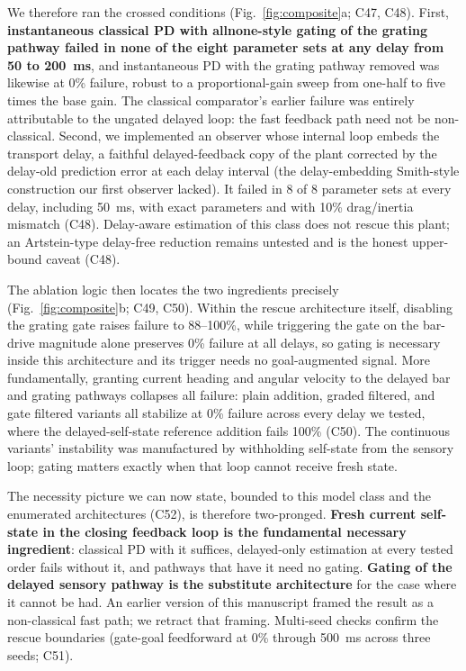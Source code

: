 \documentclass[pdflatex,sn-nature]{sn-jnl}
\begin{document}
We therefore ran the crossed conditions (Fig.~\ref{fig:composite}a; C47, C48). First, \textbf{instantaneous classical PD with allnone-style gating of the grating pathway failed in none of the eight parameter sets at any delay from 50 to 200~ms}, and instantaneous PD with the grating pathway removed was likewise at 0\% failure, robust to a proportional-gain sweep from one-half to five times the base gain. The classical comparator's earlier failure was entirely attributable to the ungated delayed loop: the fast feedback path need not be non-classical. Second, we implemented an observer whose internal loop embeds the transport delay, a faithful delayed-feedback copy of the plant corrected by the delay-old prediction error at each delay interval (the delay-embedding Smith-style construction our first observer lacked). It failed in 8 of 8 parameter sets at every delay, including 50~ms, with exact parameters and with 10\% drag/inertia mismatch (C48). Delay-aware estimation of this class does not rescue this plant; an Artstein-type delay-free reduction remains untested and is the honest upper-bound caveat (C48).

The ablation logic then locates the two ingredients precisely (Fig.~\ref{fig:composite}b; C49, C50). Within the rescue architecture itself, disabling the grating gate raises failure to 88--100\%, while triggering the gate on the bar-drive magnitude alone preserves 0\% failure at all delays, so gating is necessary inside this architecture and its trigger needs no goal-augmented signal. More fundamentally, granting current heading and angular velocity to the delayed bar and grating pathways collapses all failure: plain addition, graded filtered, and gate filtered variants all stabilize at 0\% failure across every delay we tested, where the delayed-self-state reference addition fails 100\% (C50). The continuous variants' instability was manufactured by withholding self-state from the sensory loop; gating matters exactly when that loop cannot receive fresh state.

The necessity picture we can now state, bounded to this model class and the enumerated architectures (C52), is therefore two-pronged. \textbf{Fresh current self-state in the closing feedback loop is the fundamental necessary ingredient}: classical PD with it suffices, delayed-only estimation at every tested order fails without it, and pathways that have it need no gating. \textbf{Gating of the delayed sensory pathway is the substitute architecture} for the case where it cannot be had. An earlier version of this manuscript framed the result as a non-classical fast path; we retract that framing. Multi-seed checks confirm the rescue boundaries (gate-goal feedforward at 0\% through 500~ms across three seeds; C51).
\end{document}
